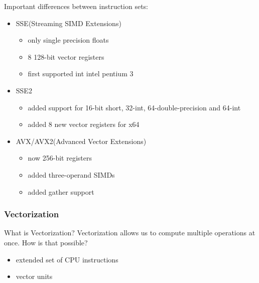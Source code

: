 \documentclass[compress]{beamer}
\begin{document}
\begin{frame}
    Important differences between instruction sets:
    \begin{itemize}
        \item SSE(Streaming SIMD Extensions)
            \begin{itemize}
                \item only single precision floats
                \item 8 128-bit vector registers
                \item first supported int intel pentium 3
            \end{itemize}
        \item SSE2
            \begin{itemize}
                \item added support for 16-bit short, 32-int, 64-double-precision and 64-int
                \item added 8 new vector registers for x64
            \end{itemize}
        \item AVX/AVX2(Advanced Vector Extensions)
            \begin{itemize}
                \item now 256-bit registers
                \item added three-operand SIMDs
                \item added gather support
            \end{itemize}
        \end{itemize}
   \end{frame}


\begin{frame}[fragile]
    \frametitle{Vectorization}

What is Vectorization?\newline\newline
Vectorization allows us to compute multiple operations at once.\newline\newline
How is that possible?
    \begin{itemize}
        \item extended set of CPU instructions
        \item vector units
    \end{itemize}
\end{frame}
\end{document}
